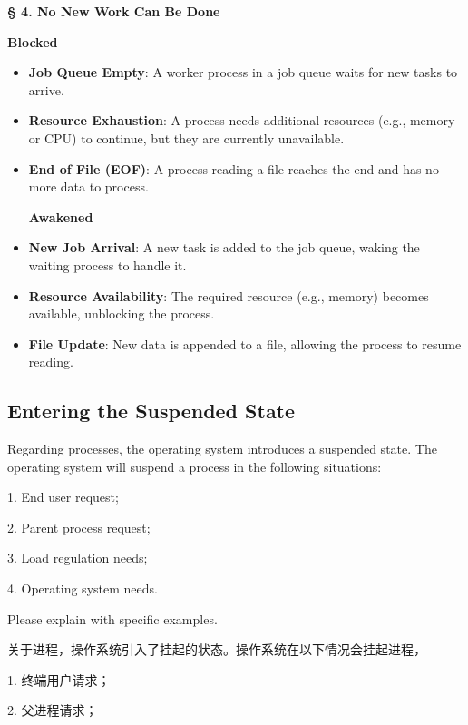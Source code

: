 \documentclass[a4paper]{book}
\newcommand{\sfbf}[1]{{\normalsize\textsf{\textbf{§ #1}}}}
\begin{document}
\hrulefill

\sfbf{4. No New Work Can Be Done}

\textbf{Blocked}
\begin{itemize}
\item 
\textbf{Job Queue Empty}: A worker process in a job queue waits for new tasks to arrive.

\item 
\textbf{Resource Exhaustion}: A process needs additional resources (e.g., memory or CPU) to continue, but they are currently unavailable.

\item 
\textbf{End of File (EOF)}: A process reading a file reaches the end and has no more data to process.

\textbf{Awakened}

\item 
\textbf{New Job Arrival}: A new task is added to the job queue, waking the waiting process to handle it.

\item 
\textbf{Resource Availability}: The required resource (e.g., memory) becomes available, unblocking the process.

\item 
\textbf{File Update}: New data is appended to a file, allowing the process to resume reading.

\end{itemize}

\subsection{Entering the Suspended State}

\begin{greenbox}
Regarding processes, the operating system introduces a suspended state. The operating system will suspend a process in the following situations:

1. End user request;

2. Parent process request;

3. Load regulation needs;

4. Operating system needs.

Please explain with specific examples.
\end{greenbox}

关于进程，操作系统引入了挂起的状态。操作系统在以下情况会挂起进程，

1. 终端用户请求；

2. 父进程请求；
\end{document}
